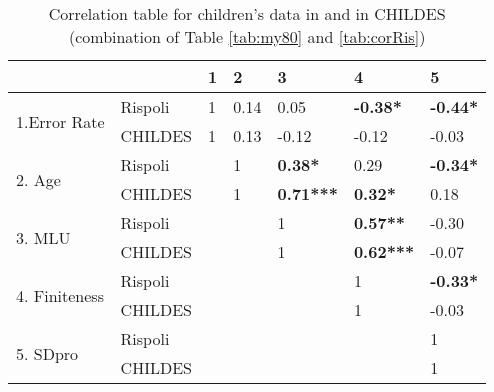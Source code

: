 \FloatBarrier
\begin{table}[!h]
\centering
\caption{Correlation table for children's data in  \cite{rispoli1994} and in CHILDES (combination of Table \ref{tab:my80} and \ref{tab:corRis})}
\label{tab:186}
\begin{tabular}{l|llllll}
\toprule
 &  & 1 & 2 & 3 & 4 & 5 \\ \hline
\multirow{2}{*}{1.Error Rate} & Rispoli & 1 & 0.14 & 0.05 & \textbf{-0.38*} & \textbf{-0.44*} \\
 & CHILDES & 1 & 0.13 & -0.12 & -0.12 & -0.03 \\ \hline
\multirow{2}{*}{2. Age} & Rispoli &  & 1 & \textbf{0.38* }& 0.29 & \textbf{-0.34*} \\
 & CHILDES &  & 1 & \textbf{0.71***} & \textbf{0.32*} & 0.18 \\ \hline
\multirow{2}{*}{3. MLU} & Rispoli &  &  & 1 & \textbf{0.57**} & -0.30 \\
 & CHILDES &  &  & 1 & \textbf{0.62***} & -0.07 \\ \hline
\multirow{2}{*}{4. Finiteness} & Rispoli &  &  &  & 1 & \textbf{-0.33*} \\
 & CHILDES &  &  &  & 1 & -0.03 \\ \hline
\multirow{2}{*}{5. SDpro} & Rispoli &  &  &  &  & 1 \\
 & CHILDES &  &  &  &  & 1\\
 \bottomrule
\end{tabular}
\end{table}
\FloatBarrier

